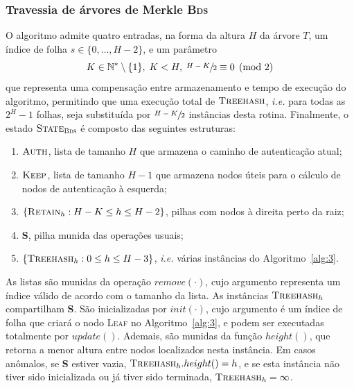 \documentclass{ufsctex/ufsctex}
\newcommand{\bds}{\textsc{Bds}}
\begin{document}
\subsubsection{Travessia de árvores de Merkle \bds{}}

O algoritmo admite quatro entradas, na forma da altura $H$ da árvore $T$, um
índice de folha $s \in \{0, \dots, H - 2\}$, e um parâmetro
\begin{equation}
  K \in \mathbb{N}^{*} \setminus \{1\},
    \; K < H, \; \sfrac{H - K}{2} \equiv 0 \pmod{2}
\end{equation}
que representa uma compensação entre armazenamento e tempo de execução do
algoritmo, permitindo que uma execução total de $\textsc{Treehash}$,
\emph{i.e.} para todas as $2^H - 1$ folhas, seja substituída por $\sfrac{H -
K}{2}$ instâncias desta rotina. Finalmente, o estado $\textsc{State}_{\bds{}}$ é
composto das seguintes estruturas:

\begin{enumerate}[label= (\roman*)]

  \item $\textsc{Auth}$, lista de tamanho $H$ que armazena o caminho de
      autenticação atual;

  \item $\textsc{Keep}$, lista de tamanho $H - 1$ que armazena nodos úteis para
      o cálculo de nodos de autenticação à esquerda;

  \item $\{\textsc{Retain}_{h} : H - K \leq h \leq H - 2\}$, pilhas com nodos
      à direita perto da raiz;

  \item \textbf{S}, pilha munida das operações usuais;

  \item $\{\textsc{Treehash}_{h} : 0 \leq h \leq H - 3\}$, \emph{i.e.} várias
      instâncias do Algoritmo~\ref{alg:3}.

\end{enumerate}

As listas são munidas da operação $remove(\cdot)$, cujo argumento representa um
índice válido de acordo com o tamanho da lista. As instâncias
$\textsc{Treehash}_{h}$ compartilham \textbf{S}. São inicializadas por
$init(\cdot)$, cujo argumento é um índice de folha que criará o nodo
\textsc{Leaf} no Algoritmo~\ref{alg:3}, e podem ser executadas totalmente por
$update()$. Ademais, são munidas da função $height()$, que retorna a menor
altura entre nodos localizados nesta instância. Em casos anômalos, se
\textbf{S} estiver vazia, $\textsc{Treehash}_{h}.height() = h$, e se esta
instância não tiver sido inicializada ou já tiver sido terminada,
$\textsc{Treehash}_{h} = \infty$.
\end{document}
